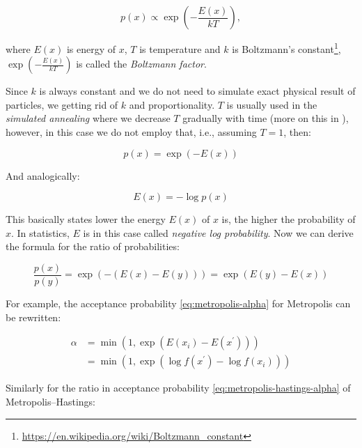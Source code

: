 \documentclass[
  digital, %
  oneside, %
  lof,     %
  lot,     %
]{fithesis4}
\begin{document}
\begin{equation}\label{eq:boltzmann-factor-prop}
  p(x) \propto \exp \left( -\frac{E(x)}{kT} \right),
\end{equation}

where $E(x)$ is energy of $x$, $T$ is temperature and $k$ is Boltzmann's constant\footnote{\url{https://en.wikipedia.org/wiki/Boltzmann_constant}}, $\exp \left( -\frac{E(x)}{kT} \right)$ is called the \textit{Boltzmann factor}.

Since $k$ is always constant and we do not need to simulate exact physical result of particles, we getting rid of $k$ and proportionality.
$T$ is usually used in the \textit{simulated annealing} where we decrease $T$ gradually with time (more on this in \cite[Chapter 8]{murphy2021}), however, in this case we do not employ that, i.e., assuming $T = 1$, then:

\begin{equation}\label{eq:boltzmann-factor-prob}
  p(x) = \exp \left( -E(x) \right)
\end{equation}

And analogically:

\begin{equation}\label{eq:boltzmann-factor-neg-log}
  E(x) = -\log p(x)
\end{equation}

This basically states lower the energy $E(x)$ of $x$ is, the higher the probability of $x$.
In statistics, $E$ is in this case called \textit{negative log probability}.
Now we can derive the formula for the ratio of probabilities:

\begin{equation}
  \frac{p(x)}{p(y)} = \exp \left( -(E(x) - E(y)) \right) = \exp \left( E(y) - E(x) \right)
\end{equation}

For example, the acceptance probability \eqref{eq:metropolis-alpha} for Metropolis can be rewritten:

\begin{equation}
  \begin{split}
    \alpha &= \min \left(
    1, 
    \exp\left( 
      E(x_{i}) - E(x^\prime)
    \right) 
  \right) \\
  & = \min \left(
    1, 
    \exp\left( 
      \log f(x^\prime) - \log f(x_{i})
    \right) 
  \right)
  \end{split}
\end{equation}

Similarly for the ratio in acceptance probability \eqref{eq:metropolis-hastings-alpha} of Metropolis–Hastings:
\end{document}
